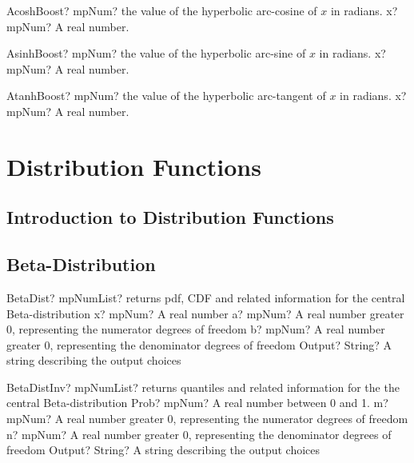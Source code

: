 \documentclass[12pt,a4paper,openany]{book}
\begin{document}
\begin{mpFunctionsExtract}
\mpFunctionOne
{AcoshBoost? mpNum? the value of the hyperbolic arc-cosine  of $x$ in radians.}
{x? mpNum? A real number.}
\end{mpFunctionsExtract}

\begin{mpFunctionsExtract}
\mpFunctionOne
{AsinhBoost? mpNum? the value of the hyperbolic arc-sine  of $x$ in radians.}
{x? mpNum? A real number.}
\end{mpFunctionsExtract}

\begin{mpFunctionsExtract}
\mpFunctionOne
{AtanhBoost? mpNum? the value of the hyperbolic arc-tangent  of $x$ in radians.}
{x? mpNum? A real number.}
\end{mpFunctionsExtract}

\chapter{Distribution Functions}

\section{Introduction to Distribution Functions}

\section{Beta-Distribution}

\begin{mpFunctionsExtract}
\mpFunctionFour
{BetaDist? mpNumList? returns pdf, CDF and related information for the central Beta-distribution}
{x? mpNum? A real number}
{a? mpNum? A real number greater 0, representing the numerator  degrees of freedom}
{b? mpNum? A real number greater 0, representing the denominator degrees of freedom}
{Output? String? A string describing the output choices}
\end{mpFunctionsExtract}

\begin{mpFunctionsExtract}
\mpFunctionFour
{BetaDistInv? mpNumList? returns quantiles and related information for the the central Beta-distribution}
{Prob? mpNum? A real number between 0 and 1.}
{m? mpNum? A real number greater 0, representing the numerator  degrees of freedom}
{n? mpNum? A real number greater 0, representing the denominator degrees of freedom}
{Output? String? A string describing the output choices}
\end{mpFunctionsExtract}
\end{document}
